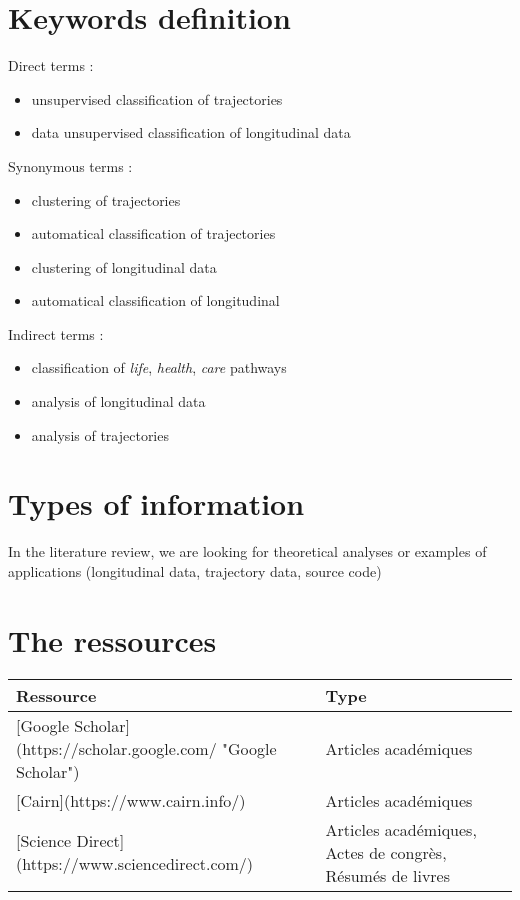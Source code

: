 \documentclass[
]{book}
\begin{document}
\hypertarget{keywords-definition}{%
\section{Keywords definition}\label{keywords-definition}}

Direct terms :

\begin{itemize}
\item
  unsupervised classification of trajectories
\item
  data unsupervised classification of longitudinal data
\end{itemize}

Synonymous terms :

\begin{itemize}
\item
  clustering of trajectories
\item
  automatical classification of trajectories
\item
  clustering of longitudinal data
\item
  automatical classification of longitudinal
\end{itemize}

Indirect terms :

\begin{itemize}
\item
  classification of \emph{life}, \emph{health}, \emph{care} pathways
\item
  analysis of longitudinal data
\item
  analysis of trajectories
\end{itemize}

\hypertarget{types-of-information}{%
\section{Types of information}\label{types-of-information}}

In the literature review, we are looking for theoretical analyses or examples of applications (longitudinal data, trajectory data, source code)

\hypertarget{the-ressources}{%
\section{The ressources}\label{the-ressources}}

\begin{table}
\centering\begingroup\fontsize{10}{12}\selectfont

\begin{tabular}{ll}
\toprule
Ressource & Type\\
\midrule
{}[Google Scholar](https://scholar.google.com/ "Google Scholar") & Articles académiques\\
{}[Cairn](https://www.cairn.info/) & Articles académiques\\
{}[Science Direct](https://www.sciencedirect.com/) & Articles académiques, Actes de congrès, Résumés de livres\\
\bottomrule
\end{tabular}
\endgroup{}
\end{table}
\end{document}
